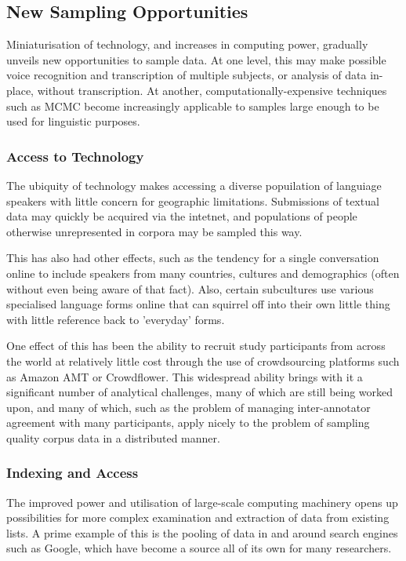 \subsection{New Sampling Opportunities}
Miniaturisation of technology, and increases in computing power, gradually unveils new opportunities to sample data.  At one level, this may make possible voice recognition and transcription of multiple subjects, or analysis of data in-place, without transcription.  At another, computationally-expensive techniques such as MCMC become increasingly applicable to samples large enough to be used for linguistic purposes.


\subsubsection{Access to Technology}
The ubiquity of technology makes accessing a diverse popuilation of languiage speakers with little concern for geographic limitations.  Submissions of textual data may quickly be acquired via the intetnet, and populations of people otherwise unrepresented in corpora may be sampled this way.


This has also had other effects, such as the tendency for a single conversation online to include speakers from many countries, cultures and demographics (often without even being aware of that fact).  Also, certain subcultures use various specialised language forms online that can squirrel off into their own little thing with little reference back to 'everyday' forms.

One effect of this has been the ability to recruit study participants from across the world at relatively little cost through the use of crowdsourcing platforms such as Amazon AMT\cite{ipeirotis2010analyzing} or Crowdflower\cite{Finin:2010:ANE:1866696.1866709}.  This widespread ability brings with it a significant number of analytical challenges, many of which are still being worked upon, and many of which, such as the problem of managing inter-annotator agreement with many participants, apply nicely to the problem of sampling quality corpus data in a distributed manner.

  


\subsubsection{Indexing and Access}
The improved power and utilisation of large-scale computing machinery opens up possibilities for more complex examination and extraction of data from existing lists.  A prime example of this is the pooling of data in and around search engines such as Google, which have become a source all of its own for many researchers.

